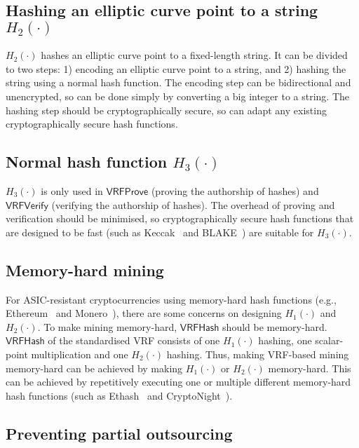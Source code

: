 \subsection{Hashing an elliptic curve point to a string $H_{2}(\cdot)$}

$H_{2}(\cdot)$ hashes an elliptic curve point to a fixed-length string.
It can be divided to two steps: 1) encoding an elliptic curve point to a string, and 2) hashing the string using a normal hash function.
The encoding step can be bidirectional and unencrypted, so can be done simply by converting a big integer to a string.
The hashing step should be cryptographically secure, so can adapt any existing cryptographically secure hash functions.


\subsection{Normal hash function $H_{3}(\cdot)$}

$H_{3}(\cdot)$ is only used in $\mathsf{VRFProve}$ (proving the authorship of hashes) and $\mathsf{VRFVerify}$ (verifying the authorship of hashes).
The overhead of proving and verification should be minimised, so cryptographically secure hash functions that are designed to be fast (such as Keccak~\cite{bertoni2013keccak} and BLAKE~\cite{aumasson2008sha}) are suitable for $H_{3}(\cdot)$.

\subsection{Memory-hard mining}

For ASIC-resistant cryptocurrencies using memory-hard hash functions (e.g., Ethereum~\cite{wood2014ethereum} and Monero~\cite{monero}), there are some concerns on designing $H_{1}(\cdot)$ and $H_{2}(\cdot)$.
To make mining memory-hard, $\mathsf{VRFHash}$ should be memory-hard.
$\mathsf{VRFHash}$ of the standardised VRF consists of one $H_{1}(\cdot)$ hashing, one scalar-point multiplication and one $H_{2}(\cdot)$ hashing.
Thus, making VRF-based mining memory-hard can be achieved by making $H_{1}(\cdot)$ or $H_{2}(\cdot)$ memory-hard.
This can be achieved by repetitively executing one or multiple different memory-hard hash functions (such as Ethash~\cite{wiki2017ethash} and CryptoNight~\cite{seigenneocortex}).


\subsection{Preventing partial outsourcing}

